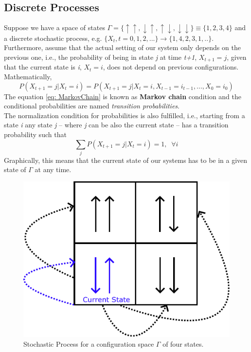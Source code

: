 \subsection{Discrete Processes}
Suppose we have a space of states $\Gamma = \{\uparrow \uparrow,\downarrow \uparrow,\uparrow \downarrow,\downarrow \downarrow \} \equiv \{1, 2, 3, 4 \}$ and a discrete stochastic process, e.g. $\{X_{t}, t= 0,1,2,...\} \rightarrow \{1,4,2,3,1,..\}$. Furthermore, assume that the actual setting of our system only depends on the previous one, i.e., the probability of being in state \textit{j} at time \textit{t+1}, $X_{t+1}= j$, given that the current state is \textit{i}, $X_{t} = i$, does not depend on previous configurations.\\
Mathematically,
\begin{equation}
\label{eq: MarkovChain}
    P\left(X_{t+1} = j | X_{t} = i\right) = P\left(X_{t+1}=j | X_{t} = i, X_{t-1} =i_{t-1},...,X_{0} = i_{0}\right)
\end{equation}
The equation \ref{eq: MarkovChain} is known as \textbf{Markov chain} condition and the conditional probabilities are named \textit{transition probabilities}.\\
The normalization condition for probabilities is also fulfilled, i.e., starting from a state  \textit{i} any state \textit{j} -- where \textit{j} can be also the current state -- has a transition probability such that
\begin{equation}
    \sum_{j}P\left(X_{t+1} = j | X_{t} = i\right) = 1, \;\; \forall i
\end{equation}
Graphically, this means that the current state of our systems has to be in a given state of $\Gamma$ at any time.
\begin{figure}[H]
    \centering
    \includegraphics[scale=0.65]{Figures/SA_StateJump.pdf}
    \caption{Stochastic Process for a configuration space $\Gamma$ of four states.}
    \label{fig:SimulatedAnneling_StatesJump}
\end{figure}
